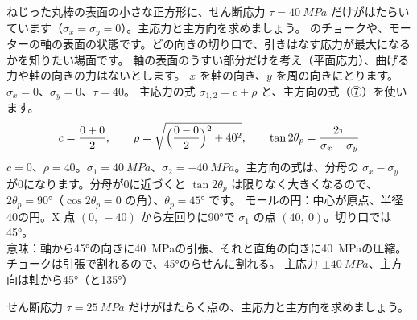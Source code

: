 \begin{phreidai}
\label{ph:力-9:ex2}ねじった丸棒の表面の小さな正方形に、せん断応力 $\tau=\qty{40}{MPa}$ だけがはたらいています（$\sigma_x=\sigma_y=0$）。主応力と主方向を求めましょう。
\phbamen
\bkhatenaref のチョークや、モーターの軸の表面の状態です。どの向きの切り口で、引きはなす応力が最大になるかを知りたい場面です。
\phmushi
軸の表面のうすい部分だけを考え（平面応力）、曲げる力や軸の向きの力はないとします。
\phzu
$x$ を軸の向き、$y$ を周の向きにとります。$\sigma_x=0$、$\sigma_y=0$、$\tau=40$。
\phriyu
主応力の式 $\sigma_{1,2}=c\pm\rho$ と、主方向の式（⑦）を使います。
\phtateru
\[c=\frac{0+0}{2},\qquad \rho=\sqrt{\Bigl(\frac{0-0}{2}\Bigr)^2+40^2},\qquad\tan2\theta_p=\frac{2\tau}{\sigma_x-\sigma_y}\]
\phtoku
$c=0$、$\rho=40$。$\sigma_1=\qty{40}{MPa}$、$\sigma_2=\qty{-40}{MPa}$。主方向の式は、分母の $\sigma_x-\sigma_y$ が0になります。分母が0に近づくと $\tan2\theta_p$ は限りなく大きくなるので、$2\theta_p=90°$（$\cos2\theta_p=0$ の角）、$\theta_p=45°$ です。
\phtashikame
モールの円：中心が原点、半径40の円。X 点 $(0,\ -40)$ から左回りに90°で $\sigma_1$ の点 $(40,\ 0)$。切り口では45°。\\
意味：軸から45°の向きに\qty{40}{MPa}の引張、それと直角の向きに\qty{40}{MPa}の圧縮。チョークは引張で割れるので、45°のらせんに割れる。
\kotae 主応力 $\pm\qty{40}{MPa}$、主方向は軸から45°（と135°）
\end{phreidai}
\begin{jibun}
せん断応力 $\tau=\qty{25}{MPa}$ だけがはたらく点の、主応力と主方向を求めましょう。
\end{jibun}

